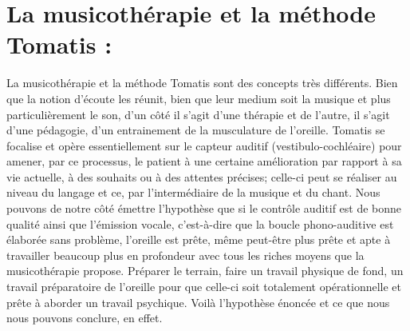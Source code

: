 \section{La musicothérapie et la méthode Tomatis : }
La musicothérapie et la méthode Tomatis sont des concepts très différents. Bien que la notion d'écoute les réunit, bien que leur medium soit la musique et plus particulièrement le son, d'un côté il s'agit d'une thérapie et de l'autre, il s'agit d'une pédagogie, d'un entrainement de la musculature de l'oreille. 
Tomatis se focalise et opère essentiellement sur le capteur auditif (vestibulo-cochléaire) pour amener, par ce processus, le patient à une certaine  amélioration par rapport à sa vie actuelle, à des souhaits ou à des attentes précises; celle-ci peut se réaliser au niveau du langage et ce, par l'intermédiaire de la musique et du chant. Nous pouvons de notre côté  émettre l'hypothèse que si le contrôle auditif est de bonne qualité ainsi que l'émission vocale, c'est-à-dire que la boucle phono-auditive est élaborée sans problème, l'oreille est prête, même peut-être plus prête et apte à travailler beaucoup plus en profondeur avec tous les riches moyens que la musicothérapie propose.
Préparer le terrain, faire un travail physique de fond, un travail préparatoire de l'oreille pour que celle-ci soit totalement opérationnelle et prête à aborder un travail psychique. Voilà l'hypothèse énoncée et ce que nous nous pouvons conclure, en effet.